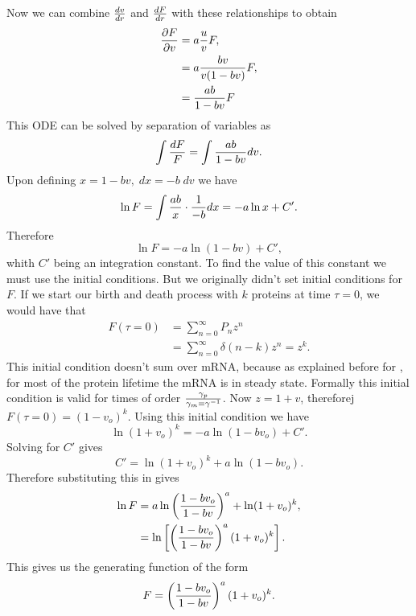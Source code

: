 Now we can combine ${dv \over dr}$ and ${dF \over dr}$ with these relationships
to obtain
\begin{align}
  {\partial F \over \partial v} &= a {u \over v} F, \\
  &= a {b v \over v (1 - b v)} F, \\
  &= {a b \over 1 - b v} F
\end{align}
This ODE can be solved by separation of variables as
\begin{equation}
  \int {dF \over F} = \int {a b \over 1 - b v} dv.
\end{equation}
Upon defining $x = 1 - b v, \; dx = - b\; dv$ we have
\begin{equation}
  \ln F = \int {a b \over x} \cdot {1 \over -b} dx = -a \ln x + C'.
\end{equation}
Therefore
\begin{equation}
  \ln F = -a \ln (1 - b v) + C',
  \label{eq_lnF_constant}
\end{equation}
whith $C'$ being an integration constant. To find the value of this constant
we must use the initial conditions. But we originally didn't set initial
conditions for $F$. If we start our birth and death process with $k$ proteins
at time $\tau = 0$, we would have that
\begin{align}
  F(\tau = 0) &= \sum_{n=0}^{\infty}P_n z^n\\
  &= \sum_{n=0}^{\infty} \delta (n - k) z^n = z^k.
\end{align}
This initial condition doesn't sum over mRNA, because as explained before for
\eref[eq_SI_31_uofv], for most of the protein lifetime the mRNA is in steady
state. Formally this initial condition is valid for times of order
${\gamma_p \over \gamma_m = \gamma^{-1}}$. Now $z = 1 + v$, thereforej
$F(\tau = 0) = (1 - v_o)^k$. Using this initial condition we have
\begin{equation}
  \ln (1 + v_o)^k = -a \ln (1 - b v_o) + C'.
\end{equation}
Solving for $C'$ gives
\begin{equation}
  C' = \ln (1 + v_o)^k + a \ln (1 - b v_o).
\end{equation}
Therefore substituting this in  gives
\begin{align}
  \ln F &= a \ln \left( {1 - b v_o \over 1 - b v} \right)^a
  + \ln (1 + v_o)^k,\\
  &= \ln \left[ \left( {1 - b v_o \over 1 - b v} \right)^a
  (1 + v_o)^k \right].
\end{align}
This gives us the generating function of the form
\begin{equation}
  F =   \left( {1 - b v_o \over 1 - b v} \right)^a
  (1 + v_o)^k .
  \label{eq_generating_function_onv}
\end{equation}

